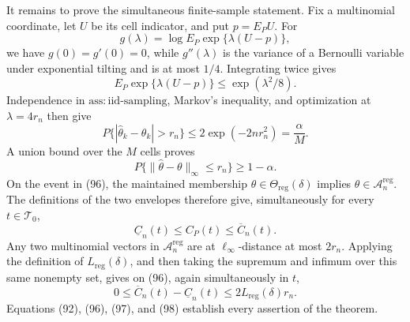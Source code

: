 It remains to prove the simultaneous finite-sample statement.  Fix a multinomial coordinate, let \(U\) be its cell indicator, and put \(p=E_PU\).  For
\[
g(\lambda)=\log E_P\exp\{\lambda(U-p)\},
\]
we have \(g(0)=g'(0)=0\), while \(g''(\lambda)\) is the variance of a Bernoulli variable under exponential tilting and is at most \(1/4\).  Integrating twice gives
\[
E_P\exp\{\lambda(U-p)\}\leq\exp(\lambda^2/8).
\tag{94}
\]
Independence in \(\mathrm{ass{:}iid\mbox{-}sampling}\), Markov's inequality, and optimization at \(\lambda=4r_n\) then give
\[
P\{|\widehat\theta_k-\theta_k|>r_n\}
\leq2\exp(-2nr_n^2)=\frac{\alpha}{M}.
\tag{95}
\]
A union bound over the \(M\) cells proves
\[
P\{\|\widehat\theta-\theta\|_\infty\leq r_n\}
\geq1-\alpha.
\tag{96}
\]
On the event in (96), the maintained membership \(\theta\in\Theta_{\mathrm{reg}}(\delta)\) implies \(\theta\in\mathcal A_n^{\mathrm{reg}}\).  The definitions of the two envelopes therefore give, simultaneously for every \(t\in\mathcal T_0\),
\[
\underline C_n(t)\leq C_P(t)\leq\overline C_n(t).
\tag{97}
\]
Any two multinomial vectors in \(\mathcal A_n^{\mathrm{reg}}\) are at \(\ell_\infty\)-distance at most \(2r_n\).  Applying the definition of \(L_{\mathrm{reg}}(\delta)\), and then taking the supremum and infimum over this same nonempty set, gives on (96), again simultaneously in \(t\),
\[
0\leq\overline C_n(t)-\underline C_n(t)
\leq2L_{\mathrm{reg}}(\delta)r_n.
\tag{98}
\]
Equations (92), (96), (97), and (98) establish every assertion of the theorem.

